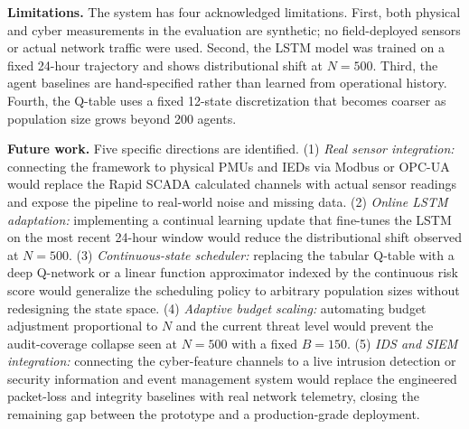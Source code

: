 \textbf{Limitations.} The system has four acknowledged limitations. First, both physical and cyber
measurements in the evaluation are synthetic; no field-deployed sensors or actual network traffic
were used. Second, the LSTM model was trained on a fixed 24-hour trajectory and shows distributional
shift at $N = 500$. Third, the agent baselines are hand-specified rather than learned from
operational history. Fourth, the Q-table uses a fixed 12-state discretization that becomes coarser
as population size grows beyond 200 agents.

\textbf{Future work.} Five specific directions are identified. (1) \textit{Real sensor integration:}
connecting the framework to physical PMUs and IEDs via Modbus or OPC-UA would replace the
Rapid SCADA calculated channels with actual sensor readings and expose the pipeline to real-world
noise and missing data. (2) \textit{Online LSTM adaptation:} implementing a continual learning
update that fine-tunes the LSTM on the most recent 24-hour window would reduce the distributional
shift observed at $N = 500$. (3) \textit{Continuous-state scheduler:} replacing the tabular
Q-table with a deep Q-network or a linear function approximator indexed by the continuous risk
score would generalize the scheduling policy to arbitrary population sizes without redesigning the
state space. (4) \textit{Adaptive budget scaling:} automating budget adjustment proportional to
$N$ and the current threat level would prevent the audit-coverage collapse seen at $N = 500$ with
a fixed $B = 150$. (5) \textit{IDS and SIEM integration:} connecting the cyber-feature channels to
a live intrusion detection or security information and event management system would replace the
engineered packet-loss and integrity baselines with real network telemetry, closing the remaining
gap between the prototype and a production-grade deployment.
